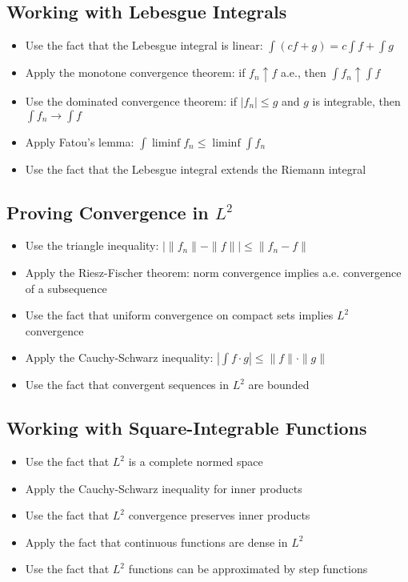 \subsection*{Working with Lebesgue Integrals}
\begin{itemize}
\item Use the fact that the Lebesgue integral is linear: $\int(cf + g) = c\int f + \int g$
\item Apply the monotone convergence theorem: if $f_n \uparrow f$ a.e., then $\int f_n \uparrow \int f$
\item Use the dominated convergence theorem: if $|f_n| \leq g$ and $g$ is integrable, then $\int f_n \to \int f$
\item Apply Fatou's lemma: $\int \liminf f_n \leq \liminf \int f_n$
\item Use the fact that the Lebesgue integral extends the Riemann integral
\end{itemize}

\subsection*{Proving Convergence in $L^2$}
\begin{itemize}
\item Use the triangle inequality: $|\| f_n \| - \| f \|| \leq \| f_n - f \|$
\item Apply the Riesz-Fischer theorem: norm convergence implies a.e. convergence of a subsequence
\item Use the fact that uniform convergence on compact sets implies $L^2$ convergence
\item Apply the Cauchy-Schwarz inequality: $|\int f \cdot g| \leq \| f \| \cdot \| g \|$
\item Use the fact that convergent sequences in $L^2$ are bounded
\end{itemize}

\subsection*{Working with Square-Integrable Functions}
\begin{itemize}
\item Use the fact that $L^2$ is a complete normed space
\item Apply the Cauchy-Schwarz inequality for inner products
\item Use the fact that $L^2$ convergence preserves inner products
\item Apply the fact that continuous functions are dense in $L^2$
\item Use the fact that $L^2$ functions can be approximated by step functions
\end{itemize}

